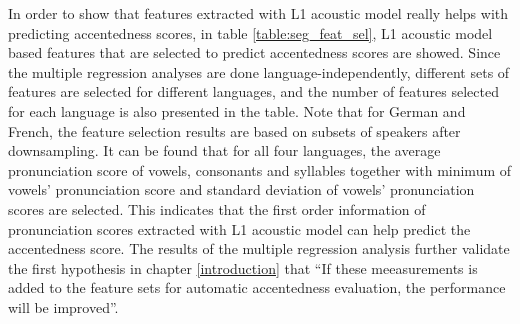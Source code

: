 In order to show that features extracted with L1 acoustic model really helps with predicting accentedness scores, in table \ref{table:seg_feat_sel}, L1 acoustic model based features that are selected to predict accentedness scores are showed. Since the multiple regression analyses are done language-independently, different sets of features are selected for different languages, and the number of features selected for each language is also presented in the table. Note that for German and French, the feature selection results are based on subsets of speakers after downsampling. It can be found that for all four languages, the average pronunciation score of vowels, consonants and syllables together with minimum of vowels' pronunciation score and standard deviation of vowels' pronunciation scores are selected. This indicates that the first order information of pronunciation scores extracted with L1 acoustic model can help predict the accentedness score. The results of the multiple regression analysis further validate the first hypothesis in chapter \ref{introduction} that ``If these meeasurements is added to the feature sets for automatic accentedness evaluation, the performance will be improved''.

